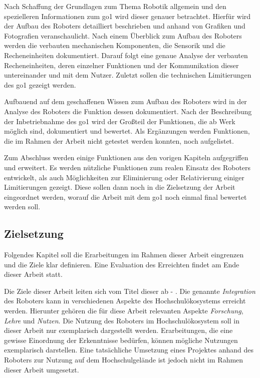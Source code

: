 Nach Schaffung der Grundlagen zum Thema Robotik allgemein und den spezielleren Informationen zum \gls{go1} wird dieser
genauer betrachtet.
Hierfür wird der Aufbau des Roboters detailliert beschrieben und anhand von Grafiken und Fotografien veranschaulicht.
Nach einem Überblick zum Aufbau des Roboters werden die verbauten mechanischen Komponenten, die Sensorik und die Recheneinheiten
dokumentiert.
Darauf folgt eine genaue Analyse der verbauten Recheneinheiten, deren einzelner Funktionen und der Kommunikation dieser
untereinander und mit dem Nutzer.
Zuletzt sollen die technischen Limitierungen des \gls{go1} gezeigt werden.

Aufbauend auf dem geschaffenen Wissen zum Aufbau des Roboters wird in der Analyse des Roboters die Funktion dessen
dokumentiert.
Nach der Beschreibung der Inbetriebnahme des \gls{go1} wird der Großteil der Funktionen, die ab Werk möglich sind,
dokumentiert und bewertet.
Als Ergänzungen werden Funktionen, die im Rahmen der Arbeit nicht getestet werden konnten, noch aufgelistet.

Zum Abschluss werden einige Funktionen aus den vorigen Kapiteln aufgegriffen und erweitert.
Es werden nützliche Funktionen zum realen Einsatz des Roboters entwickelt, als auch Möglichkeiten zur Eliminierung oder
Relativierung einiger Limitierungen gezeigt.
Diese sollen dann noch in die Zielsetzung der Arbeit eingeordnet werden, worauf die Arbeit mit dem \gls{go1} noch einmal
final bewertet werden soll.

\subsection{Zielsetzung}
\label{subsec:zielsetzung}

Folgendes Kapitel soll die Erarbeitungen im Rahmen dieser Arbeit eingrenzen und die Ziele klar definieren.
Eine Evaluation des Erreichten findet am Ende dieser Arbeit statt.


Die Ziele dieser Arbeit leiten sich vom Titel dieser ab - \emph{\mytitle}.
Die genannte \emph{Integration} des Roboters kann in verschiedenen Aspekte des Hochschulökosystems erreicht werden.
Hierunter gehören die für diese Arbeit relevanten Aspekte \emph{Forschung}, \emph{Lehre} und \emph{Nutzen}.
Die Nutzung des Roboters im Hochschulökosystem soll in dieser Arbeit nur exemplarisch dargestellt werden.
Erarbeitungen, die eine gewisse Einordnung der Erkenntnisse bedürfen, können mögliche Nutzungen exemplarisch darstellen.
Eine tatsächliche Umsetzung eines Projektes anhand des Roboters zur Nutzung auf dem Hochschulgelände ist jedoch nicht
im Rahmen dieser Arbeit umgesetzt.

